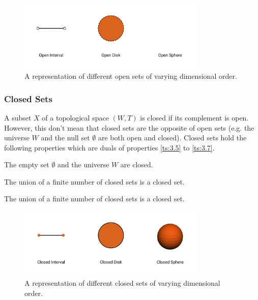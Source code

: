 \documentclass[a4paper,11pt,oneside]{article}
\begin{document}
\begin{figure}[ht]
	\begin{center}
		\includegraphics[width=0.8\textwidth]{section3/3.1/open.png}
	\end{center}
	\caption{A representation of different open sets of varying dimensional order.}
	\label{sect3:open_sets}
\end{figure}
    
\subsubsection{Closed Sets}
\begin{definition}
	A subset $X$ of a topological space $(W, T)$ is closed if its complement is open. However, this don't mean that closed sets are the opposite of open sets (e.g. the universe $W$ and the null set $\emptyset$ are both open and closed). Closed sets hold the following properties which are duals of properties \eqref{ts:3.5} to \eqref{ts:3.7}.
		    
	\begin{property}
		The empty set $\emptyset$ and the universe $W$ are closed. \cite{mansfield_1987}
	\end{property}
	\begin{property}
		The union of a finite number of closed sets is a closed set. \cite{mansfield_1987}
	\end{property}
	\begin{property}
		The union of a finite number of closed sets is a closed set. \cite{mansfield_1987}
	\end{property}
\end{definition}
    
\begin{figure}[ht]
	\begin{center}
		\includegraphics[width=0.8\textwidth]{section3/3.1/closed.png}
	\end{center}
	\caption{A representation of different closed sets of varying dimensional order.}
	\label{sect3:closed_sets}
\end{figure}
    
\end{document}
